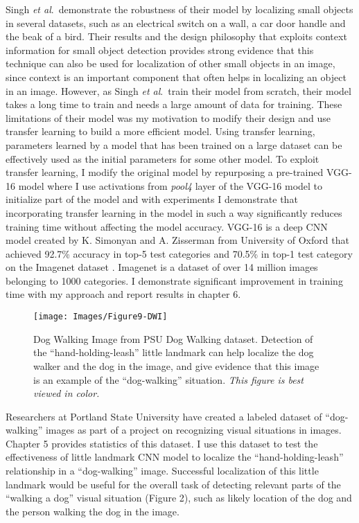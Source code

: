 \documentclass [11pt,letterpaper ,twoside ,openany ]{report}
\begin{document}
    Singh \textit {et al}.\ demonstrate the robustness of their model by localizing small objects in several datasets, such as an electrical switch on a wall, a car door handle and the beak of a bird. Their results and the design philosophy that exploits context information for small object detection provides strong evidence that this technique can also be used for localization of other small objects in an image, since context is an important component that often helps in localizing an object in an image. However, as Singh \textit{et al}.\ train their model from scratch, their model takes a long time to train and needs a large amount of data for training. These limitations of their model was my motivation to modify their design and use transfer learning to build a more efficient model. Using transfer learning, parameters learned by a model that has been trained on a large dataset can be effectively used as the initial parameters for some other model. To exploit transfer learning, I modify the original model by repurposing a pre-trained VGG-16 \cite{simonyan2014very} model where I use activations from \textit{pool4} layer of the VGG-16 model to initialize part of the model and with experiments I demonstrate that incorporating  transfer learning in the model in such a way significantly reduces training time without affecting the model accuracy. VGG-16 is a deep CNN model created by K. Simonyan and A. Zisserman from University of Oxford that achieved 92.7\% accuracy in top-5 test categories and 70.5\% in top-1 test category on the Imagenet dataset \cite{russakovsky2015imagenet}. Imagenet is a dataset of over 14 million images belonging to 1000 categories. I demonstrate significant improvement in training time with my approach and report results in chapter 6.

    \begin{wrapfigure}{l}[9mm]{0.5\textwidth}
        \begin{center}
            \texttt{[image: Images/Figure9-DWI]}
        \end{center}
        \caption{Dog Walking Image from PSU Dog Walking dataset. Detection of the ``hand-holding-leash'' little landmark can help localize the dog walker and the dog in the image, and give evidence that this image is an example of the ``dog-walking'' situation. \textit{This figure is best viewed in color.}}
    \end{wrapfigure}    

    Researchers at Portland State University have created a labeled dataset of ``dog-walking'' images as part of a project on recognizing visual situations in images. Chapter 5 provides statistics of this dataset. I use this dataset to test the effectiveness of little landmark CNN model to localize the ``hand-holding-leash'' relationship in a ``dog-walking'' image. Successful localization of this little landmark would be useful for the overall task of detecting relevant parts of the ``walking a dog'' visual situation (Figure 2), such as likely location of the dog and the person walking the dog in the image.
\end{document}
